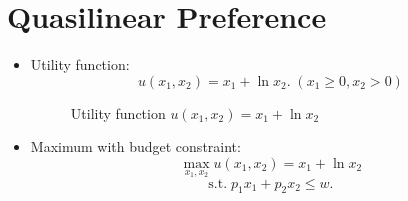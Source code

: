 \documentclass[
12pt, %
a4paper, %
onecolumn, %
portrait %
]{article}
\begin{document}
\section{Quasilinear Preference}
\begin{itemize}
	
\item Utility function:
\[
u(x_1,x_2)=x_1+\ln x_2.\;(x_1\ge0,x_2> 0)
\]

\begin{figure}[H]
	\centering
	\caption{Utility function $u(x_1,x_2)=x_1+\ln x_2$}
	\label{Fig.lable}
\end{figure}

\item Maximum with budget constraint:
\[
\max_{x_1,x_2} u(x_1,x_2)=x_1+\ln x_2
\]
\[
\text{s.t.}\;p_1x_1+p_2x_2\le w.
\]


\end{itemize}
\end{document}
